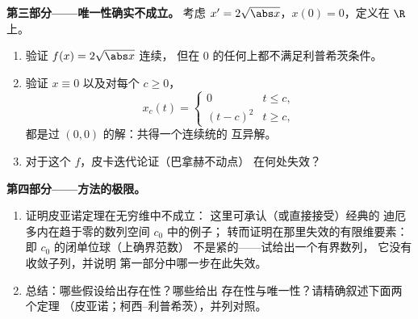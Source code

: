 \begin{problem}[{周末问题——无利普希茨条件时
$x' = f(t, x)$ 解的存在性}]
\medskip
\noindent\textbf{第三部分——唯一性确实不成立。}
考虑 $x' = 2\sqrt{\abs x}$，$x(0) = 0$，定义在 $\R$ 上。
\begin{enumerate}[resume]
  \item 验证 $f(x) = 2\sqrt{\abs x}$ 连续，
        但在 $0$ 的任何上都不满足利普希茨条件。
  \item 验证 $x \equiv 0$ 以及对每个 $c \geq 0$，
        \[
        x_c(t) = \begin{cases} 0 & t \leq c,\\ (t - c)^2 & t
        \geq c,\end{cases}
        \]
        都是过 $(0,0)$ 的解：共得一个连续统的
        互异解。
  \item 对于这个 $f$，皮卡迭代论证（巴拿赫不动点）
        在何处失效？
\end{enumerate}

\medskip
\noindent\textbf{第四部分——方法的极限。}
\begin{enumerate}[resume]
  \item 证明皮亚诺定理在无穷维中不成立：
        这里可承认（或直接接受）经典的
        迪厄多内在趋于零的数列空间 $c_0$ 中的例子；
        转而证明在那里失效的有限维要素：
        即 $c_0$ 的闭单位球（上确界范数）
        不是紧的——试给出一个有界数列，
        它没有收敛子列，并说明
        第一部分中哪一步在此失效。
  \item 总结：哪些假设给出存在性？哪些给出
        存在性与唯一性？请精确叙述下面两个定理
        （皮亚诺；柯西--利普希茨），并列对照。
\end{enumerate}


\end{problem}
